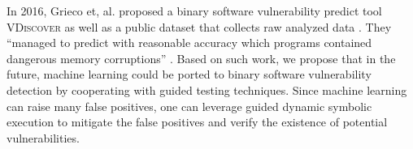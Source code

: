 In 2016, Grieco et, al. proposed a binary software vulnerability 
predict tool \textsc{VDiscover} as well as a public dataset that 
collects raw analyzed data \cite{Grieco:2016:TLV}. 
They ``managed to predict with reasonable accuracy which programs 
contained dangerous memory corruptions'' \cite{Grieco:2016:TLV}.
Based on such work, we propose that in the future, machine learning 
could be ported to binary software vulnerability detection by 
cooperating with guided testing techniques. Since machine learning 
can raise many false positives, one can leverage guided dynamic 
symbolic execution to mitigate the false positives and verify the 
existence of potential vulnerabilities.